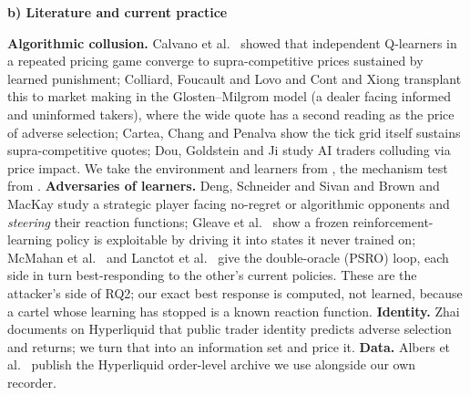 \documentclass[10pt]{article}
\newcommand{\sect}[1]{\par\vspace{5pt}\noindent\textbf{#1}\par\vspace{1.5pt}\noindent}
\begin{document}
\sect{b) Literature and current practice}
\textbf{Algorithmic collusion.} Calvano et al.\ \cite{calvano} showed that independent Q-learners in a repeated pricing game converge to supra-competitive prices sustained by learned punishment; Colliard, Foucault and Lovo \cite{cfl} and Cont and Xiong \cite{cont} transplant this to market making in the Glosten--Milgrom \cite{gm} model (a dealer facing informed and uninformed takers), where the wide quote has a second reading as the price of adverse selection; Cartea, Chang and Penalva \cite{ccp} show the tick grid itself sustains supra-competitive quotes; Dou, Goldstein and Ji \cite{dgj} study AI traders colluding via price impact. We take the environment and learners from \cite{cfl}, the mechanism test from \cite{calvano}. \textbf{Adversaries of learners.} Deng, Schneider and Sivan \cite{dss} and Brown and MacKay \cite{brownmackay} study a strategic player facing no-regret or algorithmic opponents and \emph{steering} their reaction functions; Gleave et al.\ \cite{gleave} show a frozen reinforcement-learning policy is exploitable by driving it into states it never trained on; McMahan et al.\ \cite{mcmahan} and Lanctot et al.\ \cite{psro} give the double-oracle (PSRO) loop, each side in turn best-responding to the other's current policies. These are the attacker's side of RQ2; our exact best response is computed, not learned, because a cartel whose learning has stopped is a known reaction function. \textbf{Identity.} Zhai \cite{zhai} documents on Hyperliquid that public trader identity predicts adverse selection and returns; we turn that into an information set and price it. \textbf{Data.} Albers et al.\ \cite{albers} publish the Hyperliquid order-level archive we use alongside our own recorder.
\end{document}

